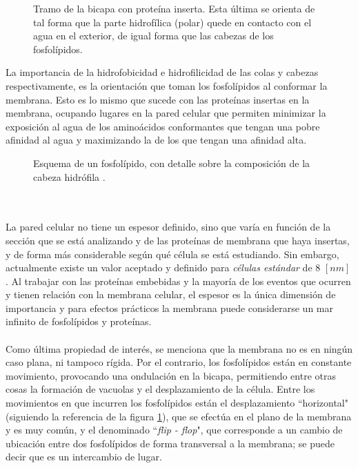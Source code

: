 \documentclass[12pt, twoside, onehalfspace, numbers, spanish]{ezthesis}
\numberwithin{equation}{section}
\begin{document}
\begin{figure}[h]
	\centering
	
	\caption{Tramo de la bicapa con proteína inserta. Esta última se orienta de tal forma que la parte hidrofílica (polar) quede en contacto con el agua en el exterior, de igual forma que las cabezas de los fosfolípidos.} \label{Fig:Fig_5-2}
\end{figure}
\noindent
La importancia de la hidrofobicidad e hidrofilicidad de las colas y cabezas respectivamente, es la orientación que toman los fosfolípidos al conformar la membrana. Esto es lo mismo que sucede con las proteínas insertas en la membrana, ocupando lugares en la pared celular que permiten minimizar la exposición al agua de los aminoácidos conformantes que tengan una pobre afinidad al agua y maximizando la de los que tengan una afinidad alta.
\begin{figure}[h]
	\centering
	
	\caption{Esquema de un fosfolípido, con detalle sobre la composición de la cabeza hidrófila \cite{Alberts}.}\label{Fig:Fig_5}
\end{figure}
\\\\
La pared celular no tiene un espesor definido, sino que varía en función de la sección que se está analizando y de las proteínas de membrana que haya insertas, y de forma más considerable según qué célula se está estudiando. Sin embargo, actualmente existe un valor aceptado y definido para \textit{células estándar} de 8 $[nm]$ \cite{Lombard}. Al trabajar con las proteínas embebidas y la mayoría de los eventos que ocurren y tienen relación con la membrana celular, el espesor es la única dimensión de importancia y para efectos prácticos la membrana puede considerarse un mar infinito de fosfolípidos y proteínas.\\\\
Como última propiedad de interés, se menciona que la membrana no es en ningún caso plana, ni tampoco rígida. Por el contrario, los fosfolípidos están en constante movimiento, provocando una ondulación en la bicapa, permitiendo entre otras cosas la formación de vacuolas y el desplazamiento de la célula. Entre los movimientos en que incurren los fosfolípidos están el desplazamiento ``horizontal" (siguiendo la referencia de la figura \ref{Fig:Fig_5-2}), que se efectúa en el plano de la membrana y es muy común, y el denominado ``\textit{flip - flop}", que corresponde a un cambio de ubicación entre dos fosfolípidos de forma transversal a la membrana; se puede decir que es un intercambio de lugar.\\\\
\end{document}
